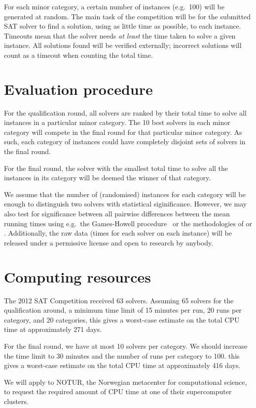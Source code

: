 \documentclass[12pt, a4paper]{article}
\begin{document}
For each minor category, a certain number of instances (e.g.\ 100) will be generated at random. The main task of the competition will be for the submitted SAT solver to find a solution, using as little time as possible, to each instance. Timeouts mean that the solver needs \emph{at least} the time taken to solve a given instance. All solutions found will be verified externally; incorrect solutions will count as a timeout when counting the total time.

\section{Evaluation procedure}




For the qualification round, all solvers are ranked by their total time to solve all instances in a particular minor category. The 10 best solvers in each minor category will compete in the final round for that particular minor category. As such, each category of instances could have completely disjoint sets of solvers in the final round.

For the final round, the solver with the smallest total time to solve all the instances in its category will be deemed the winner of that category.

We assume that the number of (randomised) instances for each category will be enough to distinguish two solvers with statistical siginificance. However, we may also test for significance between all pairwise differences between the mean running times using e.g.\ the Games-Howell procedure~\cite{Games1979} or the methodologies of \cite{Nikolic2010} or \cite{Gelder2011}. Additionally, the raw data (times for each solver on each instance) will be released under a permissive license and open to research by anybody.

\section{Computing resources}

The 2012 SAT Competition received 63 solvers. Assuming 65 solvers for the qualification around, a minimum time limit of 15 minutes per run, 20 runs per category, and 20 categories, this gives a worst-case estimate on the total CPU time at approximately 271 days.

For the final round, we have at most 10 solvers per category. We should increase the time limit to 30 minutes and the number of runs per category to 100. this gives a worst-case estimate on the total CPU time at approximately 416 days.

We will apply to NOTUR, the Norwegian metacenter for computational science, to request the required amount of CPU time at one of their supercomputer clusters.


\end{document}
